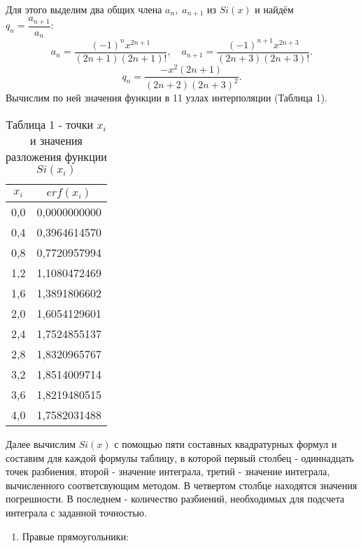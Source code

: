 \documentclass[a4paper,12pt]{article}
\begin{document}
{Для этого выделим два общих члена $a_n, \; a_{n + 1}$ из $Si(x)$ и найдём\\ $q_n = \dfrac{a_{n+1}}{a_n}$:
    \begin{equation}
        a_{n}=\frac{(-1)^{n}x^{2n+1}}{(2n+1)(2n+1)!}, \quad a_{n+1}=\frac{(-1)^{n+1}x^{2n+3}}{(2n+3)(2n+3)!}.
    \end{equation}
    \begin{equation}
        q_{n}=\frac{-x^{2}(2n+1)}{(2n+2)(2n+3)^2}.
    \end{equation}
Вычислим по ней значения функции в 11 узлах интерполяции (Таблица 1).
\begin{table}[h]
    \centering
    \begin{tabular}{|c|c|}
         \hline
        $x_i$ & $erf(x_i)$\\
        \hline
        0,0 & 0,0000000000\\
        \hline
        0,4 & 0,3964614570\\
        \hline
        0,8 & 0,7720957994\\
        \hline
        1,2 & 1,1080472469\\
        \hline
        1,6 & 1,3891806602\\
        \hline
        2,0 & 1,6054129601\\
        \hline
        2,4 & 1,7524855137\\
        \hline
        2,8 & 1,8320965767\\
        \hline
        3,2 & 1,8514009714\\
        \hline
        3,6 & 1,8219480515\\
        \hline
        4,0 & 1,7582031488\\
        \hline
    \end{tabular}
    \caption*{\small{Таблица 1 - точки $x_i$ и значения разложения функции $Si(x_i)$}}
\end{table}
\clearpage
Далее вычислим $Si(x)$ с помощью пяти составных квадратурных формул и соста\-вим для каждой формулы таблицу, в которой первый столбец - одиннадцать точек разбиения, второй - значение интеграла, третий - значение интеграла, вычисленного соответсвующим методом. В четвертом столбце находятся значения погрешности. В последнем - количество разбиений, необходимых для подсчета интеграла с заданной точностью.
\begin{enumerate}[label = \arabic*.]
    \item {Правые прямоугольники:
        \begin{table}[h]

\end{table}}
\end{enumerate}}
\end{document}
